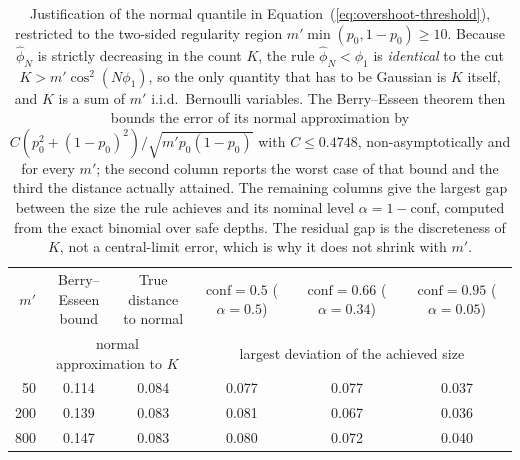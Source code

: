 \begin{table}[ht]
\centering
\small
\caption{Justification of the normal quantile in Equation~(\ref{eq:overshoot-threshold}), restricted to the two-sided regularity region $m'\min(p_0,1-p_0)\geq 10$. Because $\hat\phi_N$ is strictly decreasing in the count $K$, the rule $\hat\phi_N < \phi_1$ is \emph{identical} to the cut $K > m'\cos^2(N\phi_1)$, so the only quantity that has to be Gaussian is $K$ itself, and $K$ is a sum of $m'$ i.i.d.\ Bernoulli variables. The Berry--Esseen theorem then bounds the error of its normal approximation by $C(p_0^2+(1-p_0)^2)/\sqrt{m'p_0(1-p_0)}$ with $C \leq 0.4748$, non-asymptotically and for every $m'$; the second column reports the worst case of that bound and the third the distance actually attained. The remaining columns give the largest gap between the size the rule achieves and its nominal level $\alpha = 1-\mathrm{conf}$, computed from the exact binomial over safe depths. The residual gap is the discreteness of $K$, not a central-limit error, which is why it does not shrink with $m'$.}
\label{tab:overshoot-operating}
\setlength{\tabcolsep}{6pt}
\begin{tabular}{r cc ccc}
\toprule
$m'$ & \makecell{Berry--Esseen \\ bound} & \makecell{True distance \\ to normal} & \makecell{$\mathrm{conf} = 0.5$ \\ ($\alpha = 0.5$)} & \makecell{$\mathrm{conf} = 0.66$ \\ ($\alpha = 0.34$)} & \makecell{$\mathrm{conf} = 0.95$ \\ ($\alpha = 0.05$)} \\
\cmidrule(lr){2-3}\cmidrule(lr){4-6}
& \multicolumn{2}{c}{normal approximation to $K$} & \multicolumn{3}{c}{largest deviation of the achieved size} \\
\midrule
50 & 0.114 & 0.084 & 0.077 & 0.077 & 0.037 \\
200 & 0.139 & 0.083 & 0.081 & 0.067 & 0.036 \\
800 & 0.147 & 0.083 & 0.080 & 0.072 & 0.040 \\
\bottomrule
\end{tabular}
\end{table}
